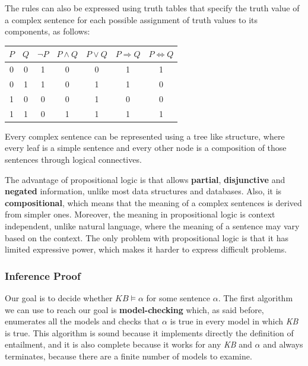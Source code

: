 \documentclass{article}
\begin{document}
\noindent
The rules can also be expressed using truth tables that specify the truth value of a complex sentence for each possible assignment of truth values to its components, as follows:

\begin{table}[h]
    \centering
    \begin{tabular}{c|c||c|c|c|c|c}
        $P$ & $Q$ & $\neg P$ & $P \land Q$ & $P\lor Q$ & $P\Rightarrow Q$ & $P \Leftrightarrow Q$ \\ \hline\hline
        0 & 0 & 1 & 0 & 0 & 1 & 1 \\ \hline
        0 & 1 & 1 & 0 & 1 & 1 & 0 \\ \hline
        1 & 0 & 0 & 0 & 1 & 0 & 0 \\ \hline
        1 & 1 & 0 & 1 & 1 & 1 & 1
    \end{tabular}
\end{table}

Every complex sentence can be represented using a tree like structure, where every leaf is a simple sentence and every other node is a composition of those sentences through logical connectives.

The advantage of propositional logic is that allows \textbf{partial}, \textbf{disjunctive} and \textbf{negated} information, unlike most data structures and databases. Also, it is \textbf{compositional}, which means that the meaning of a complex sentences is derived from simpler ones. Moreover, the meaning in propositional logic is context independent, unlike natural language, where the meaning of a sentence may vary based on the context. The only problem with propositional logic is that it has limited expressive power, which makes it harder to express difficult problems.

\subsubsection{Inference Proof}
Our goal is to decide whether $KB \models \alpha$ for some sentence $\alpha$. The first algorithm we can use to reach our goal is \textbf{model-checking} which, as said before, enumerates all the models and checks that $\alpha$ is true in every model in which \textit{KB} is true. This algorithm is sound because it implements directly the definition of entailment, and it is also complete because it works for any \textit{KB} and $\alpha$ and always terminates, because there are a finite number of models to examine.
\end{document}
